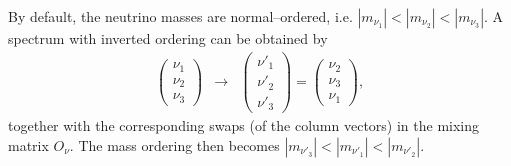 \documentclass[pdflatex,final,3p,times]{elsarticle}
\begin{document}
By default, the
neutrino masses are normal--ordered,
i.e. $|m_{\nu_1}|<|m_{\nu_2}|<|m_{\nu_3}|$.  A spectrum with inverted
ordering can be obtained by
\begin{eqnarray}
\left ( \begin{array}{c}
\nu_1 \\ \nu_2 \\ \nu_3 \end{array} \right ) &\to&
\left ( \begin{array}{c}
\nu'_1 \\ \nu'_2 \\ \nu'_3 \end{array} \right ) = 
\left ( \begin{array}{c}
\nu_2 \\ \nu_3 \\ \nu_1 \end{array} \right ),
\end{eqnarray}
together with the corresponding swaps (of the column vectors) in the
mixing matrix $O_{\nu}$.  The mass ordering then becomes
$|m_{\nu'_3}|<|m_{\nu'_1}|<|m_{\nu'_2}|$.
\end{document}
